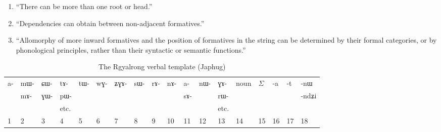 \documentclass[oldfontcommands,oneside,a4paper,11pt]{memoir}
\newcommand{\ipab}[1]{{\scriptsize \phon#1}}
\begin{document}
\begin{enumerate}
\item ``There can be more than one root or head.''
\item ``Dependencies can obtain between non-adjacent formatives.''
\item ``Allomorphy of more inward formatives and the position of formatives in the string can be determined by their formal categories, or by phonological principles, rather than their syntactic or semantic functions.''
\end{enumerate}
\begin{table}[H]
\caption{ The Rgyalrong verbal template (Japhug)}\label{tab:template}
\begin{tabular}{llllllllllllllllll} \toprule
 
\ipab{a-}  &  	\ipab{mɯ- }   &  	\ipab{ɕɯ-}   &\ipab{tɤ-} &  	\ipab{tɯ-}  &  	\ipab{wɣ-}   &  	\ipab{ʑɣɤ-}  &  	\ipab{sɯ-}   & \ipab{rɤ-} & \ipab{nɤ-} &   	\ipab{a-}  &  	\ipab{nɯ-}  &  	\ipab{ɣɤ-}  &  	\ipab{noun}    &  	 \begin{math}\Sigma\end{math}    &  	\ipab{-a}  &  	\ipab{-t}  &  	\ipab{-nɯ}   &  \\
   &  	\ipab{mɤ-}   &  	\ipab{ɣɯ-}   &\ipab{pɯ-}&  	  & & 	  &  	  &  	  &  	  &  	 \ipab{sɤ-}&&  	\ipab{rɯ-}  &  	  &  	  &  	  &  	  &  	\ipab{-ndʑi} &  \\
  &  	   &     &  etc.	  & & 	  &  	  &&  	  &  	  &  	 & &  etc.	  &  	  &  	  &  	  &  	  &  	  &  \\
1  &  	2  &  	3  &  	4  &  	5  &  	6  &  	7  &  	8  &  	9  &  	10  &  	11  &  	12  &  	13  &  	14  &  	15  & 16 &17 & 18\\
\bottomrule
\end{tabular}
\end{table}
 
\end{document}
